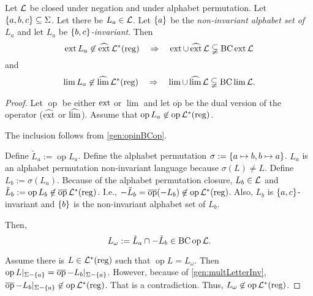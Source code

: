 \begin{theorem}
\label{gen:extInBCext}
Let $\mathcal{L}$ be closed under negation and under alphabet permutation. Let $\Set{a,b,c} \subseteq \Sigma$. Let there be $L_a \in \mathcal{L}$. Let $\Set{a}$ be the \emph{non-invariant alphabet set of $L_a$} and let $L_a$ be \emph{$\Set{b,c}$-invariant}. Then
\[ \ext L_a \not\in \dext \Langreg \ \ \ \Rightarrow \ \ \ \ext \cup \dext \Lang \subsetneqq \BC \ext \Lang \]
and
\[ \lim L_a \not\in \operatorname{\widehat{lim}} \mathcal{L}^*(\textup{\textrm{reg}}) \ \ \ \Rightarrow \ \ \ \lim \cup \operatorname{\widehat{lim}} \mathcal{L} \subsetneqq \operatorname{BC} \lim \mathcal{L} . \]
\begin{proof}
\def\op{\operatorname{op}}
\def\dop{\operatorname{\overline{op}}}
Let $\op$ be either $\operatorname{ext}$ or $\lim$ and let $\dop$ be the dual version of the operator ($\operatorname{\widehat{ext}}$ or $\operatorname{\widehat{lim}}$). Assume that $\op L_a \not\in \op \Langreg$.

The inclusion follows from \cref{gen:opinBCop}.

Define $\tilde L_a := \op L_a$. Define the alphabet permutation $\sigma := \Set{a \mapsto b, b \mapsto a}$. $L_a$ is an alphabet permutation non-invariant language because $\sigma(L) \neq L$. Define $L_b := \sigma(L_a)$. Because of the alphabet permutation closure, $L_b \in \mathcal{L}$ and $\tilde L_b := \op L_b \not\in \dop \Langreg$. I.e., $-\tilde L_b = \dop (-L_b) \not\in \op \Langreg$. Also, $L_b$ is $\Set{a,c}$-invariant and $\Set{b}$ is the non-invariant alphabet set of $L_b$.

Then,
\[ L_\omega := \tilde L_a \cap -\tilde L_b \in \BC \op \Lang . \]

Assume there is $L \in \mathcal{L}^*(\textup{\textrm{reg}})$ such that $\op L =  L_\omega$. Then $\op L|_{\Sigma-\Set{a}} = \dop -L_b |_{\Sigma-\Set{a}}$. However, because of \cref{gen:multLetterInv}, $\dop {-L_b} |_{\Sigma-\Set{a}} \not\in \op \Langreg$. That is a contradiction. Thus, $L_\omega \not\in \op \Langreg$.


\end{proof}
\end{theorem}
